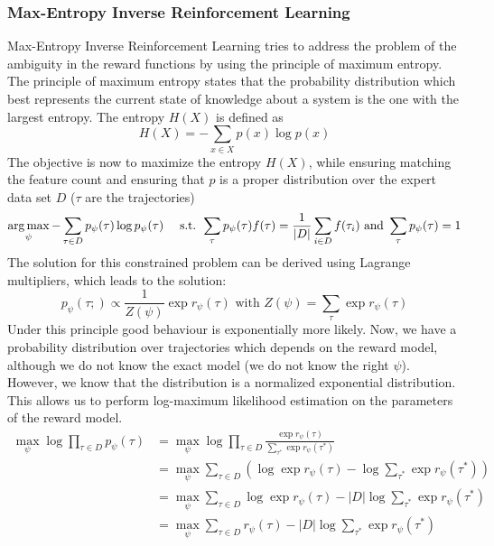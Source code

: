 \subsubsection{Max-Entropy Inverse Reinforcement Learning} \label{MaxEntIRL}
Max-Entropy Inverse Reinforcement Learning tries to address the problem of the ambiguity in the reward functions by 
using the principle of maximum entropy. The principle of maximum entropy states that the probability distribution which best 
represents the current state of knowledge about a system is the one with the largest 
entropy. The entropy $H(X)$ is defined as $$H(X) =- \sum_{x\in X} p(x)\log{p(x)}$$ 
The objective is now to maximize the entropy $H(X)$, while ensuring matching the feature count
and ensuring that $p$ is a proper distribution over the expert data set $D$ ($\tau$ are the trajectories)
$$\operatorname*{arg\,max}\limits_\psi - \sum_{\tau\in D} p_\psi(\tau)\log{p_\psi(\tau)} \quad \text{ s.t. } \sum_{\tau} p_\psi(\tau)f(\tau) = \frac{1}{|D|}\sum_{i \in D}f(\tau_i)
\text{ and } \sum_{\tau} p_\psi(\tau) = 1$$
The solution for this constrained problem can be derived using Lagrange multipliers, which leads to the 
solution: 
$$p_\psi(\tau;) \propto \frac{1}{Z(\psi)}\exp{r_{\psi}(\tau)} \text{ with } Z(\psi) = \sum_\tau \exp{r_\psi(\tau)}$$
Under this principle good behaviour is exponentially more likely. Now, we have a probability distribution over trajectories 
which depends on the reward model, although we do not know the exact model (we do not know the right 
$\psi$). However, we know that the distribution is a normalized exponential distribution. 
This allows us to perform log-maximum likelihood estimation on the parameters of the 
reward model.
\begin{align*}
    \max_\psi \log{\prod_{\tau \in D}p_\psi(\tau)} &= \max_\psi \log{\prod_{\tau \in D}}  \frac{\exp{r_{\psi}(\tau)}}{\sum_{\tau^*} \exp{r_\psi(\tau^*)}} \\
    &=  \max_\psi \sum_{\tau \in D}\left(\log{\exp{r_{\psi}(\tau)}} - \log{\sum_{\tau^*} \exp{r_\psi(\tau^*)}}\right) \\
    &= \max_\psi \sum_{\tau \in D}\log{\exp{r_{\psi}(\tau)}} - |D|\log{\sum_{\tau^*} \exp{r_\psi(\tau^*)}} \\
    &= \max_\psi \sum_{\tau \in D}r_{\psi}(\tau) - |D|\log{\sum_{\tau^*} \exp{r_\psi(\tau^*)}}
\end{align*}
